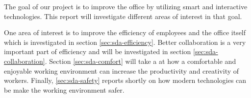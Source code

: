 The goal of our project is to improve the office by utilizing smart and interactive technologies. This report will investigate different areas of interest in that goal. 

One area of interest is to improve the efficiency of employees and the office itself which is investigated in section \ref{sec:sda-efficiency}. Better collaboration is a very important part of efficiency and will be investigated in section \ref{sec:sda-collaboration}. Section \ref{sec:sda-comfort} will take a at how a comfortable and enjoyable working environment can increase the productivity and creativity of workers. Finally, \ref{sec:sda-safety} reports shortly on how modern technologies can be make the working environment safer.